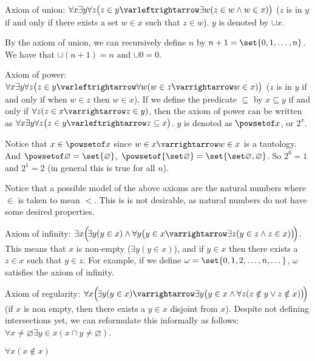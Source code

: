 \documentclass[10pt]{article}
\let\to=\varrightarrow
\let\oto=\varleftrightarrow
\begin{document}
    \item Axiom of union: $\forall x\exists y\forall z\bigl(z\in y\oto\exists w(z\in w\land w\in x)\bigr)$ ($z$ is in $y$ if and only if there exists a set $w\in x$ such that $z\in w$).
    $y$ is denoted by $\cup x$.

    \btext By the axiom of union, we can recursively define $n$ by $n+1=\set{0,1,\dots,n}$.
    We have that $\cup(n+1)=n$ and $\cup0=0$.

    \item Axiom of power: $\forall x\exists y\forall z\bigl(z\in y\oto\forall w(w\in z\to w\in x)\bigr)$ ($z$ is in $y$ if and only if when $w\in z$ then $w\in x$).
    If we define the predicate $\subseteq$ by $x\subseteq y$ if and only if $\forall z(z\in x\to z\in y)$, then the axiom of power can be written as
    $\forall x\exists y\forall z\bigl(z\in y\oto z\subseteq x\bigr)$.
    $y$ is denoted as $\powsetof x$, or $2^x$.

    \btext Notice that $x\in\powsetof x$ since $w\in x\to w\in x$ is a tautology.
    And $\powsetof\varnothing=\set{\varnothing}$, $\powsetof{\set\varnothing}=\set{\set\varnothing,\varnothing}$.
    So $2^0=1$ and $2^1=2$ (in general this is true for all $n$).

    Notice that a possible model of the above axioms are the natural numbers where $\in$ is taken to mean $<$.
    This is is not desirable, as natural numbers do not have some desired properties.

    \item Axiom of infinity: $\exists x\Bigl(\!\exists y(y\in x)\land\forall y\bigl(y\in x\to\exists z(y\in z\land z\in x)\bigr)\!\Bigr)$.
    This means that $x$ is non-empty ($\exists y(y\in x)$), and if $y\in x$ then there exists a $z\in x$ such that $y\in z$.
    For example, if we define $\omega=\set{0,1,2,\dots,n,\dots}$, $\omega$ satisfies the axiom of infinity.

    \item Axiom of regularity: $\forall x\Bigl(\!\exists y(y\in x)\to\exists y\bigl(y\in x\land\forall z(z\notin y\lor z\notin x)\bigr)\!\Bigr)$ (if $x$ is non empty, then there exists a $y\in x$ disjoint
    from $x$).
    Despite not defining intersections yet, we can reformulate this informally as follows: $\forall x\neq\varnothing\exists y\in x(x\cap y\neq\varnothing)$.
\eenum

\begin{lemm*}

    $\forall x(x\notin x)$

\end{lemm*}
\end{document}
